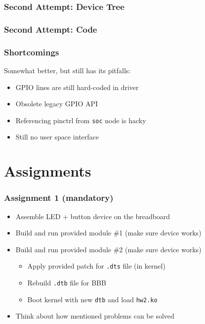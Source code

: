 \documentclass[aspectratio=169,usenames,dvipsnames]{beamer}
\newcounter{cont}
\begin{document}
\begin{frame}[containsverbatim]
  \frametitle{Second Attempt: Device Tree}
  
\end{frame}

\begin{frame}[containsverbatim,allowframebreaks=1]
  \frametitle{Second Attempt: Code}
  
\end{frame}

\begin{frame}
  \frametitle{Shortcomings}
  Somewhat better, but still has its pitfalls:
  \begin{itemize}
    \item GPIO lines are still hard-coded in driver
    \item Obsolete legacy GPIO API
    \item Referencing pinctrl from \texttt{soc} node is hacky
    \item Still no user space interface
  \end{itemize}
\end{frame}

\section{Assignments}

\begin{frame}
  \frametitle{Assignment 1 (mandatory)}
  \begin{itemize}
    \item Assemble LED + button device on the breadboard
    \item Build and run provided module \#1 (make sure device works)
    \item Build and run provided module \#2 (make sure device works)
    \begin{itemize}
      \item Apply provided patch for \texttt{.dts} file (in kernel)
      \item Rebuild \texttt{.dtb} file for BBB
      \item Boot kernel with new \texttt{dtb} and load \texttt{hw2.ko}
    \end{itemize}
    \item Think about how mentioned problems can be solved
  \end{itemize}
\end{frame}
\end{document}
